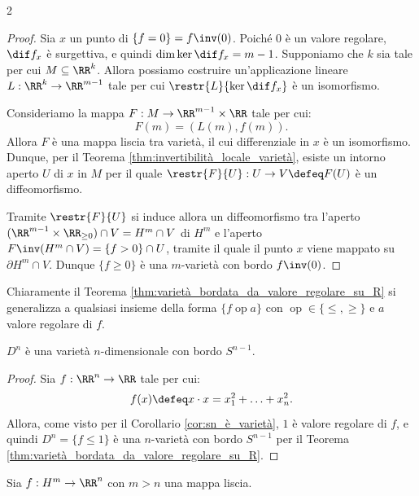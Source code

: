 \begin{multicols*}{2}
\begin{proof}
        Sia $x$ un punto di $\{f = 0\} = f\inv(0)$. Poiché $0$ è un valore regolare, $\dif f_x$ è
        surgettiva, e quindi $\dim \ker \dif f_x = m - 1$. Supponiamo che $k$ sia tale per cui $M \subseteq \RR^k$.
        Allora possiamo costruire un'applicazione lineare $L : \RR^k \to \RR^{m-1}$ tale per cui
        $\restr{L}{\ker \dif f_x}$ è un isomorfismo. \smallskip

        Consideriamo la mappa $F : M \to \RR^{m-1} \times \RR$ tale per cui:
        \[
            F(m) = (L(m), f(m)).
        \]
        Allora $F$ è una mappa liscia tra varietà, il cui differenziale in $x$ è un isomorfismo. Dunque, per il
        Teorema \ref{thm:invertibilità_locale_varietà}, esiste un intorno aperto $U$ di $x$ in $M$ per il quale
        $\restr{F}{U} : U \to V \defeq F(U)$ è un diffeomorfismo. \smallskip

        Tramite $\restr{F}{U}$ si induce allora un diffeomorfismo tra l'aperto $(\RR^{m-1} \times \RR_{\geq 0}) \cap V = H^m \cap V$
        di $H^m$ e l'aperto $F\inv(H^m \cap V) = \{ f > 0 \} \cap U$, tramite il quale il punto $x$ viene
        mappato su $\partial H^m \cap V$. Dunque $\{ f \geq 0 \}$ è una $m$-varietà con bordo $f\inv(0)$.
    \end{proof}

    \begin{remark}
        Chiaramente il Teorema \ref{thm:varietà_bordata_da_valore_regolare_su_R} si generalizza
        a qualsiasi insieme della forma $\{ f \operatorname{op} a \}$ con $\operatorname{op} \in \{\leq, \geq\}$
        e $a$ valore regolare di $f$.
    \end{remark}

    \begin{corollary}
        $D^n$ è una varietà $n$-dimensionale con bordo $S^{n-1}$.
    \end{corollary}

    \begin{proof}
        Sia $f : \RR^n \to \RR$ tale per cui:
        \[
            f(x) \defeq x \cdot x = x_1^2 + \ldots + x_{n}^2.
        \]
        Allora, come visto per il Corollario \ref{cor:sn_è_varietà},
        $1$ è valore regolare di $f$, e quindi $D^n = \{ f \leq 1 \}$ è
        una $n$-varietà con bordo $S^{n-1}$ per il Teorema \ref{thm:varietà_bordata_da_valore_regolare_su_R}.
    \end{proof}

    \begin{lemma} \label{lem:varietà_bordata_da_valore_regolare_caso_particolare}
        Sia $f : H^m \to \RR^n$ con $m > n$ una mappa liscia. \smallskip


\end{lemma}
\end{multicols*}
